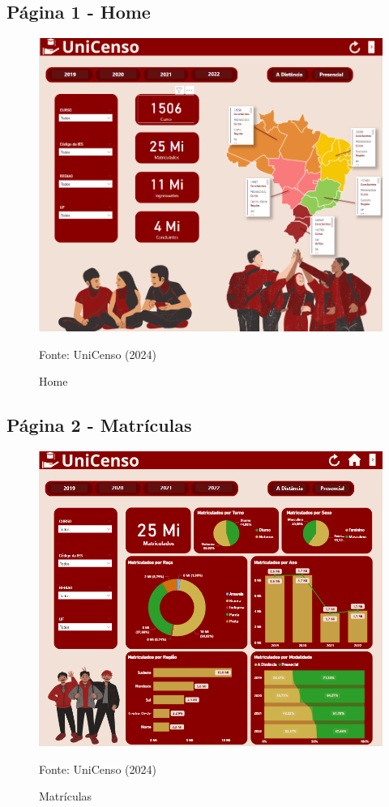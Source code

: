 \documentclass[a4paper,12pt]{article}
\begin{document}
\subsection{Página 1 - Home}
\begin{figure}[H]
    \centering
    \includegraphics[width=\textwidth]{Imagem_1}
    \caption{Home}
    \label{fig:dashboard}
    \small Fonte: UniCenso (2024)
\end{figure}

\subsection{Página 2 - Matrículas}
\begin{figure}[H]
    \centering
    \includegraphics[scale=0.6]{Imagem_2}
    \caption{Matrículas}
    \label{fig:ingressantes_raca}
    \small Fonte: UniCenso (2024)
\end{figure}
\end{document}
